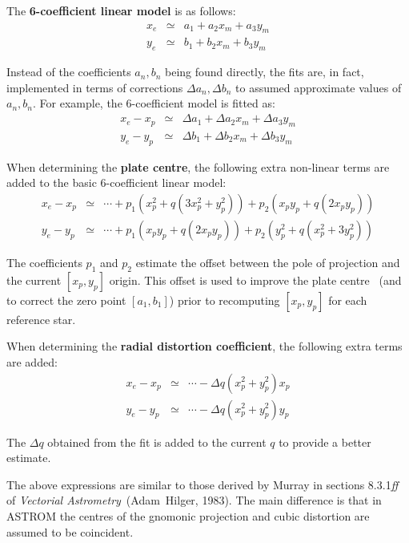 The {\bf 6-coefficient linear model} is as follows:
\begin{eqnarray*}
x_{e} & \simeq & a_{1} + a_{2} x_{m} + a_{3} y_{m} \\
y_{e} & \simeq & b_{1} + b_{2} x_{m} + b_{3} y_{m}
\end{eqnarray*}

Instead of the coefficients $a_{n},b_{n}$ being found
directly, the fits are, in fact, implemented in terms of
corrections
$\Delta a_{n},\Delta b_{n}$ to assumed approximate values of
$a_{n},b_{n}$.  For example, the 6-coefficient model is fitted as:
\begin{eqnarray*}
x_{e} - x_{p} & \simeq & \Delta a_{1}
          + \Delta a_{2} x_{m} + \Delta a_{3} y_{m} \\
y_{e} - y_{p} &\simeq & \Delta b_{1}
          + \Delta b_{2} x_{m} + \Delta b_{3} y_{m}
\end{eqnarray*}

When determining the {\bf plate centre}, the following extra non-linear
terms are added to the basic 6-coefficient linear model:
\begin{eqnarray*}
x_{e} - x_{p} & \simeq & \cdots + p_{1} (x_{p}^{2} + q (3 x_{p}^{2} + y_{p}^{2}))
                    + p_{2} (x_{p}y_{p} + q (2 x_{p}y_{p})) \\
y_{e} - y_{p} & \simeq & \cdots + p_{1} (x_{p}y_{p} + q (2 x_{p}y_{p}))
                    + p_{2} (y_{p}^{2} + q (x_{p}^{2} + 3 y_{p}^{2}))
\end{eqnarray*}

The coefficients $p_{1}$ and $p_{2}$ estimate the offset between
the pole of projection and the current $[x_{p},y_{p}]$ origin.  This
offset is used to improve the plate centre \radec\ (and
to correct the zero point $[a_{1},b_{1}]$) prior to recomputing
$[x_{p},y_{p}]$ for each reference star.

When determining the {\bf radial distortion coefficient}, the
following extra
terms are added:
\begin{eqnarray*}
x_{e} - x_{p} & \simeq & \cdots - \Delta q (x_{p}^{2} + y_{p}^{2}) x_{p} \\
y_{e} - y_{p} & \simeq & \cdots - \Delta q (x_{p}^{2} + y_{p}^{2}) y_{p}
\end{eqnarray*}

The $\Delta q$ obtained from the fit
is added to the current $q$ to provide a better estimate.

The above expressions are similar to those derived by Murray in sections
8.3.1{\it ff}\, of {\it Vectorial Astrometry}\, (Adam~Hilger, 1983).  The
main difference is that in ASTROM the centres of the gnomonic projection
and cubic distortion are assumed to be coincident.

